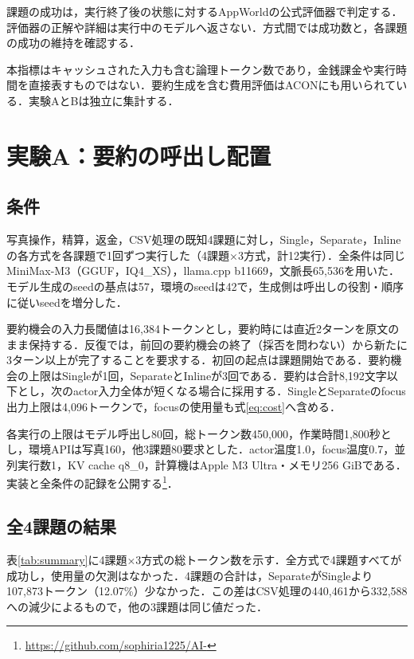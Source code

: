 \documentclass[letter]{ieicej}
\begin{document}
課題の成功は，実行終了後の状態に対するAppWorld\cite{trivedi2024appworld}の公式評価器で判定する．評価器の正解や詳細は実行中のモデルへ返さない．方式間では成功数と，各課題の成功の維持を確認する．

本指標はキャッシュされた入力も含む論理トークン数であり，金銭課金や実行時間を直接表すものではない\cite{xu2026tokenpilot}．要約生成を含む費用評価はACON\cite{kang2026acon}にも用いられている．実験AとBは独立に集計する．

\newpage
\section{実験A：要約の呼出し配置}

\subsection{条件}

写真操作，精算，返金，CSV処理の既知4課題に対し，Single，Separate，Inlineの各方式を各課題で1回ずつ実行した（4課題×3方式，計12実行）．全条件は同じMiniMax-M3（GGUF，IQ4\_XS），llama.cpp b11669，文脈長65,536を用いた．モデル生成のseedの基点は57，環境のseedは42で，生成側は呼出しの役割・順序に従いseedを増分した．

要約機会の入力長閾値は16,384トークンとし，要約時には直近2ターンを原文のまま保持する．反復では，前回の要約機会の終了（採否を問わない）から新たに3ターン以上が完了することを要求する．初回の起点は課題開始である．要約機会の上限はSingleが1回，SeparateとInlineが3回である．要約は合計8,192文字以下とし，次のactor入力全体が短くなる場合に採用する．SingleとSeparateのfocus出力上限は4,096トークンで，focusの使用量も式\eqref{eq:cost}へ含める．

各実行の上限はモデル呼出し80回，総トークン数450,000，作業時間1,800秒とし，環境APIは写真160，他3課題80要求とした．actor温度1.0，focus温度0.7，並列実行数1，KV cache q8\_0，計算機はApple M3 Ultra・メモリ256 GiBである．実装と全条件の記録を公開する\footnote{\url{https://github.com/sophiria1225/AI-}}．

\subsection{全4課題の結果}

表\ref{tab:summary}に4課題×3方式の総トークン数を示す．全方式で4課題すべてが成功し，使用量の欠測はなかった．4課題の合計は，SeparateがSingleより107,873トークン（12.07\%）少なかった．この差はCSV処理の440,461から332,588への減少によるもので，他の3課題は同じ値だった．
\end{document}
